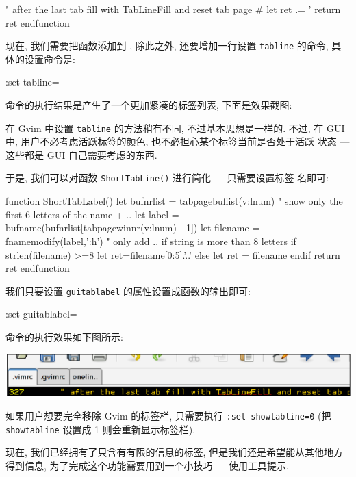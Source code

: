 \begin{warning}
\begin{vimscript}
 " after the last tab fill with TabLineFill and reset tab page #
  let ret .= '%
  return ret
endfunction
\end{vimscript}

现在, 我们需要把函数添加到 , 除此之外, 还要增加一行设置
\texttt{tabline} 的命令, 具体的设置命令是:
\begin{vimcmd}
:set tabline=%
\end{vimcmd}
命令的执行结果是产生了一个更加紧凑的标签列表, 下面是效果截图:
\begin{center}
\end{center}

在 Gvim 中设置 \texttt{tabline} 的方法稍有不同, 不过基本思想是一样的. 不过,
在 GUI 中, 用户不必考虑活跃标签的颜色, 也不必担心某个标签当前是否处于活跃
状态 --- 这些都是 GUI 自己需要考虑的东西.

于是, 我们可以对函数 \texttt{ShortTabLine()} 进行简化 --- 只需要设置标签
名即可:
\begin{vimscript}
function ShortTabLabel()
 let bufnrlist = tabpagebuflist(v:lnum)
 " show only the first 6 letters of the name + ..
 let label = bufname(bufnrlist[tabpagewinnr(v:lnum) - 1])
 let filename = fnamemodify(label,':h')
 " only add .. if string is more than 8 letters
  if strlen(filename) >=8
     let ret=filename[0:5].'..'
  else
    let ret = filename
 endif
     return ret
 endfunction
\end{vimscript}
我们只要设置 \texttt{guitablabel} 的属性设置成函数的输出即可:
\begin{vimcmd}
:set guitablabel=%
\end{vimcmd}
命令的执行效果如下图所示:
\begin{center}
\includegraphics[scale=0.8]{./images/page36}
\end{center}

\begin{warning}
如果用户想要完全移除 Gvim 的标签栏, 只需要执行 \texttt{:set showtabline=0}
(把 \texttt{showtabline} 设置成 1 则会重新显示标签栏).
\end{warning}

现在, 我们已经拥有了只含有有限的信息的标签, 但是我们还是希望能从其他地方
得到信息, 为了完成这个功能需要用到一个小技巧 --- 使用工具提示.


\end{warning}
